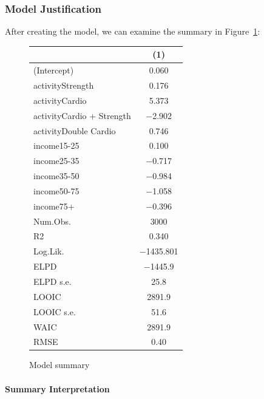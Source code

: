 \documentclass[
  letterpaper,
  DIV=11,
  numbers=noendperiod]{scrartcl}
\let\oldparagraph\paragraph
\renewcommand{\paragraph}[1]{\oldparagraph{#1}\mbox{}}
\begin{document}
\hypertarget{model-justification}{%
\subsubsection{Model Justification}\label{model-justification}}

After creating the model, we can examine the summary in
Figure~\ref{fig-summary}:

\begin{figure}

{\centering 

\hypertarget{fig-summary-1}{}
\begin{table}
\centering
\begin{tabular}[t]{lc}
\toprule
  & (1)\\
\midrule
(Intercept) & \num{0.060}\\
activityStrength & \num{0.176}\\
activityCardio & \num{5.373}\\
activityCardio + Strength & \num{-2.902}\\
activityDouble Cardio & \num{0.746}\\
income15-25 & \num{0.100}\\
income25-35 & \num{-0.717}\\
income35-50 & \num{-0.984}\\
income50-75 & \num{-1.058}\\
income75+ & \num{-0.396}\\
\midrule
Num.Obs. & \num{3000}\\
R2 & \num{0.340}\\
Log.Lik. & \num{-1435.801}\\
ELPD & \num{-1445.9}\\
ELPD s.e. & \num{25.8}\\
LOOIC & \num{2891.9}\\
LOOIC s.e. & \num{51.6}\\
WAIC & \num{2891.9}\\
RMSE & \num{0.40}\\
\bottomrule
\end{tabular}
\end{table}

}

\caption{\label{fig-summary}Model summary}

\end{figure}

\hypertarget{summary-interpretation}{%
\paragraph{Summary Interpretation}\label{summary-interpretation}}
\end{document}
